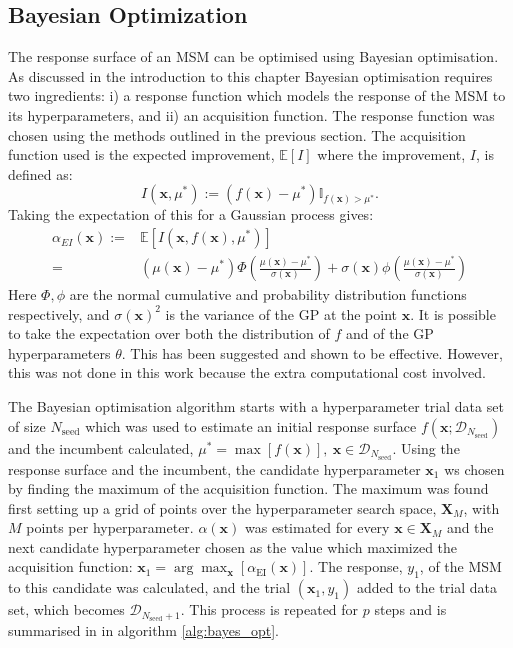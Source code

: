 \subsection{Bayesian Optimization}\label{subsec:bayes_opt}

The response surface of an MSM can be optimised using Bayesian optimisation. As discussed in the introduction to this chapter Bayesian optimisation requires two ingredients: i) a response function which models the response of the MSM to its hyperparameters, and ii) an acquisition function. The response function was chosen using the methods outlined in the previous section. The acquisition function used is the expected improvement, $\mathbb{E}\left[I\right]$ where the improvement, $I$, is defined as:\cite{shahriariTakingHumanOut2016}
\begin{equation}
    I(\mathbf{x}, \mu^{*}):=(f(\mathbf{x}) - \mu^{*}) \mathbb{I}_{f(\mathbf{x}) > \mu^{*}}.
\end{equation}
Taking the expectation of this for a Gaussian process gives:\cite{shahriariTakingHumanOut2016} 
\begin{align}\label{eqn:msm_ei_def}
        \alpha_{EI}(\mathbf{x}) := &  \mathbb{E}\left[I(\mathbf{x}, f(\mathbf{x}), \mu^{*})\right] \\
         =  &(\mu(\mathbf{x}) - \mu^{*})\Phi\left( \frac{ \mu(\mathbf{x}) - \mu^{*} }{\sigma(\mathbf{x})} \right ) + \sigma(\mathbf{x})\phi\left( \frac{ \mu(\mathbf{x}) - \mu^{*} }{\sigma(\mathbf{x}) } \right )
\end{align}
Here $\Phi, \phi$ are the normal cumulative and probability distribution functions respectively, and $\sigma(\mathbf{x})^{2}$ is the variance of the GP at the point $\mathbf{x}$. It is possible to take the expectation over both the distribution of $f$ and of the GP hyperparameters $\theta$. This has been suggested and shown to be effective.\cite{NIPS2012_4522} However, this was not done in this work because the extra computational cost involved. 

The Bayesian optimisation algorithm starts with a hyperparameter trial data set of size $N_{\mathrm{seed}}$ which was used to estimate an initial response surface $f(\mathbf{x}; \mathcal{D}_{N_{\mathrm{seed}}})$ and the incumbent calculated, $\mu^{*} = \max{[f(\mathbf{x})]},\ \mathbf{x}\in \mathcal{D}_{N_{\mathrm{seed}}}$. Using the response surface and the incumbent, the  candidate hyperparameter $\mathbf{x}_{1}$ ws chosen by finding the maximum of the acquisition function. The maximum was found first setting up a grid of points over the hyperparameter search space, $\mathbf{X}_{M}$, with $M$ points per hyperparameter.  $\alpha(\mathbf{x})$ was estimated for every $\mathbf{x}\in \mathbf{X}_{M}$ and the next candidate hyperparameter chosen as the value which maximized the acquisition function: $\mathbf{x}_{1} = \arg\max_{\mathbf{x}}\left[ \alpha_{\mathrm{EI}}(\mathbf{x})\right]$. The response, $y_{1}$, of the MSM to this candidate was calculated, and the trial $(\mathbf{x}_{1}, y_{1})$ added to the trial data set, which becomes  $\mathcal{D}_{N_{\mathrm{seed}}+1}$. This process is repeated for $p$ steps and is summarised in in algorithm \ref{alg:bayes_opt}.

